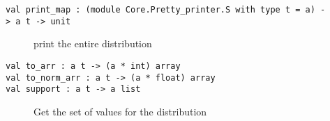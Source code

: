 \begin{description}
\item[{\protect\hyperlink{val-printux5fmap}{}\texttt{val\ print\_map\ :\ (module\ Core.Pretty\_printer.S\ with\ type\ t\ =\ \textquotesingle{}a)\ -\textgreater{}\ \textquotesingle{}a\ t\ -\textgreater{}\ unit}}]
print the entire distribution
\end{description}

\begin{description}
\item[{\protect\hyperlink{val-toux5farr}{}\texttt{val\ to\_arr\ :\ \textquotesingle{}a\ t\ -\textgreater{}\ (\textquotesingle{}a\ *\ int)\ array}\\
\protect\hyperlink{val-toux5fnormux5farr}{}\texttt{val\ to\_norm\_arr\ :\ \textquotesingle{}a\ t\ -\textgreater{}\ (\textquotesingle{}a\ *\ float)\ array}\\
\protect\hyperlink{val-support}{}\texttt{val\ support\ :\ \textquotesingle{}a\ t\ -\textgreater{}\ \textquotesingle{}a\ list}}]
Get the set of values for the distribution
\end{description}
